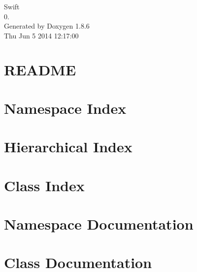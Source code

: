 \documentclass[twoside]{book}
\newcommand{\clearemptydoublepage}{%
  \newpage{\pagestyle{empty}\cleardoublepage}%
}
\begin{document}
\hypersetup{pageanchor=false}
\begin{titlepage}
\vspace*{7cm}
\begin{center}%
{\Large Swift \\[1ex]\large 0. }\\
\vspace*{1cm}
{\large Generated by Doxygen 1.8.6}\\
\vspace*{0.5cm}
{\small Thu Jun 5 2014 12:17:00}\\
\end{center}
\end{titlepage}
\clearemptydoublepage
\tableofcontents
\clearemptydoublepage
{}
\hypersetup{pageanchor=true}

\chapter{R\-E\-A\-D\-M\-E}
\label{md__r_e_a_d_m_e}
\hypertarget{md__r_e_a_d_m_e}{}

\chapter{Namespace Index}

\chapter{Hierarchical Index}

\chapter{Class Index}

\chapter{Namespace Documentation}

\chapter{Class Documentation}


































\newpage
{}
{}
\printindex
\end{document}
